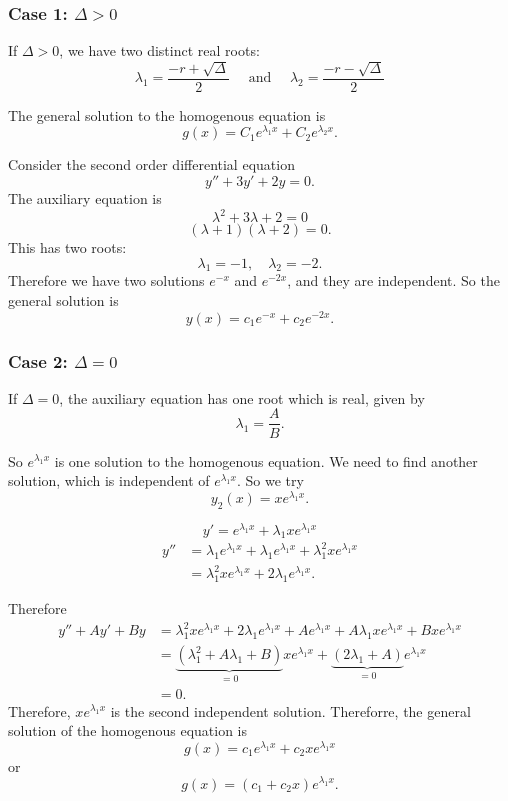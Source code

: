\subsubsection{Case 1: $\Delta>0$}
If $\Delta>0$, we have two distinct real roots:
\[\lambda_1=\frac{-r+\sqrt{\Delta}}{2}\quad\text{ and }\quad \lambda_2=\frac{-r-\sqrt{\Delta}}{2}\]

The general solution to the homogenous equation is 
\[g(x)=C_1e^{\lambda_1x}+C_2e^{\lambda_2x}.\]

\begin{example}
Consider the second order differential equation
\[y''+3y'+2y=0.\]
The auxiliary equation is
\[\lambda^2+3\lambda+2=0\]
\[(\lambda+1)(\lambda+2)=0.\]
This has two roots:
\[\lambda_1=-1,\quad \lambda_2=-2.\]
Therefore we have two solutions $e^{-x}$ and $e^{-2x}$, and they are independent. So the general solution is
\[y(x)=c_1e^{-x}+c_2e^{-2x}.\]
\end{example}

\subsubsection{Case 2: $\Delta=0$}
If $\Delta=0$, the auxiliary equation has one root which is real, given by
\[\lambda_1=\frac{A}{B}.\]

So $e^{\lambda_1x}$ is one solution to the homogenous equation. We need to find another solution, which is independent of $e^{\lambda_1x}$. So we try
\[y_2(x)=xe^{\lambda_1x}.\]

\[y'=e^{\lambda_1 x}+\lambda_1xe^{\lambda_1x}\]
\begin{align*}
y''&=\lambda_1e^{\lambda_1 x}+\lambda_1e^{\lambda_1 x}+\lambda_1^2xe^{\lambda_1 x}\\
&=\lambda_1^2xe^{\lambda_1 x}+2\lambda_1e^{\lambda_1 x}.
\end{align*}

Therefore
\begin{align*}
y''+Ay'+By &= \lambda_1^2xe^{\lambda_1 x}+2\lambda_1e^{\lambda_1 x}+Ae^{\lambda_1 x}+A\lambda_1xe^{\lambda_1x}+Bxe^{\lambda_1x} \\
&= \underbrace{(\lambda_1^2+A\lambda_1+B)}_{=0}xe^{\lambda_1x} + \underbrace{(2\lambda_1 +A)}_{=0}e^{\lambda_1x} \\
&= 0.
\end{align*}
Therefore, $xe^{\lambda_1x}$ is the second independent solution. Thereforre, the general solution of the homogenous equation is
\[g(x)=c_1e^{\lambda_1x}+c_2xe^{\lambda_1x}\]
or
\[g(x)=(c_1+c_2x)e^{\lambda_1x}.\]

